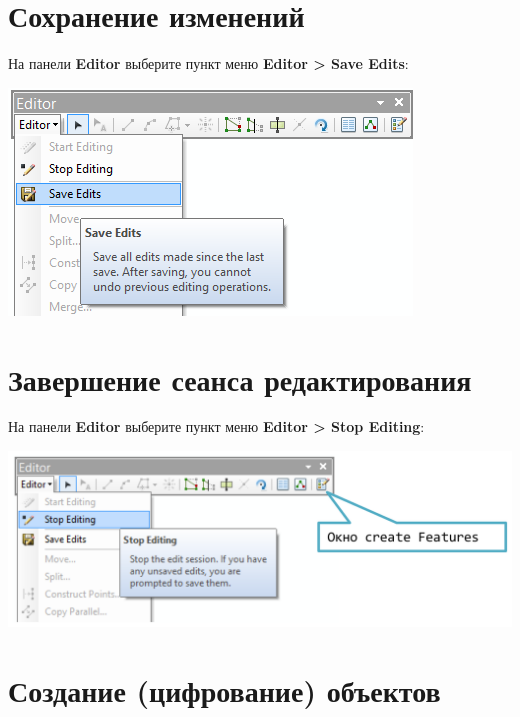 \documentclass[]{book}
\theoremstyle{definition}
\theoremstyle{definition}
\theoremstyle{definition}
\theoremstyle{remark}
\begin{document}
\hypertarget{manual-edit-save}{%
\section{Сохранение изменений}\label{manual-edit-save}}

На панели \textbf{Editor} выберите пункт меню \textbf{Editor
\textgreater{} Save Edits}:

\includegraphics{images/Appendix/image89.png}

\hypertarget{manual-edit-end}{%
\section{Завершение сеанса редактирования}\label{manual-edit-end}}

На панели \textbf{Editor} выберите пункт меню \textbf{Editor
\textgreater{} Stop Editing}:

\includegraphics{images/Appendix/image90.png}

\hypertarget{manual-edit-create}{%
\section{Создание (цифрование) объектов}\label{manual-edit-create}}
\end{document}
